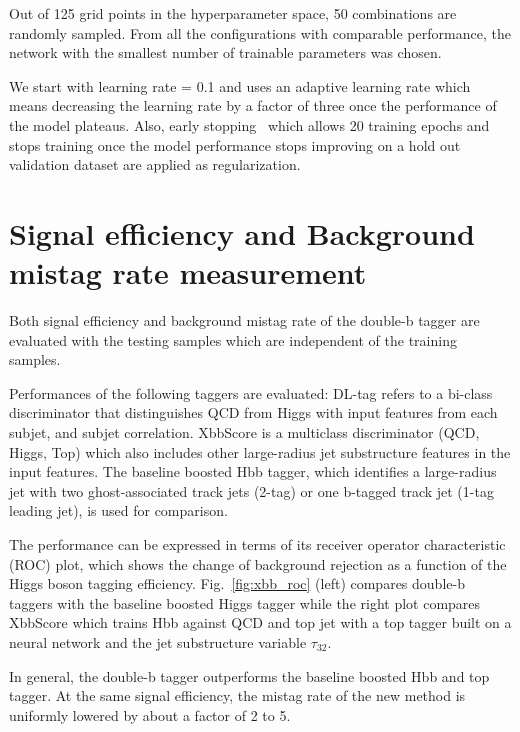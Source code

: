 \par Out of 125 grid points in the hyperparameter space, 50 combinations are randomly sampled. From all the configurations with comparable performance, the network with the smallest number of trainable parameters was chosen. 
\par We start with learning rate = 0.1 and uses an adaptive learning rate which means decreasing the learning rate by a factor of three once the performance of the model plateaus. Also, early stopping~\cite{Yao07onearly} which allows 20 training epochs and stops training once the model performance stops improving on a hold out validation dataset are applied as regularization. 

\section{Signal efficiency and Background mistag rate measurement}
\label{sec:per}

\par Both signal efficiency and background mistag rate of the double-b tagger are evaluated with the testing samples which are independent of the training samples.

\par Performances of the following taggers are evaluated: DL-tag refers to a bi-class discriminator that distinguishes QCD from Higgs with input features from each subjet, and subjet correlation. 
XbbScore is a multiclass discriminator (QCD, Higgs, Top) which also includes other large-radius jet substructure features in the input features. 
The baseline boosted Hbb tagger, which identifies a large-radius jet with two ghost-associated track jets (2-tag) or one b-tagged track jet (1-tag leading jet), is used for comparison.
\par The performance can be expressed in terms of its receiver operator characteristic (ROC) plot, which shows the change of background rejection as a function of the Higgs boson tagging efficiency. Fig.~\ref{fig:xbb_roc} (left) compares double-b taggers with the baseline boosted Higgs tagger while the right plot compares XbbScore which trains Hbb against QCD and top jet with a top tagger built on a neural network and the jet substructure variable $\tau_{32}$.
\par In general, the double-b tagger outperforms the baseline boosted Hbb and top tagger. At the same signal efficiency, the mistag rate of the new method is uniformly lowered by about a factor of 2 to 5.

